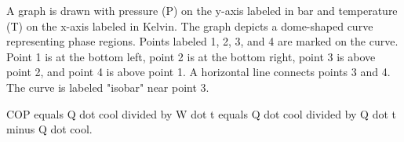 A graph is drawn with pressure (P) on the y-axis labeled in bar and temperature (T) on the x-axis labeled in Kelvin. The graph depicts a dome-shaped curve representing phase regions. Points labeled 1, 2, 3, and 4 are marked on the curve. Point 1 is at the bottom left, point 2 is at the bottom right, point 3 is above point 2, and point 4 is above point 1. A horizontal line connects points 3 and 4. The curve is labeled "isobar" near point 3.

COP equals Q dot cool divided by W dot t equals Q dot cool divided by Q dot t minus Q dot cool.